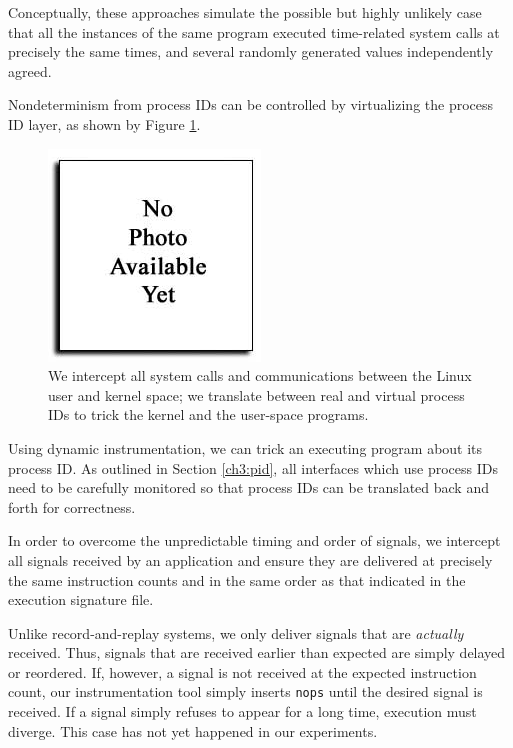 Conceptually, these approaches simulate the possible but highly
unlikely case that all the instances of the same program
executed time-related system calls
at precisely the same times,
and several randomly generated values independently agreed. \newline

 \newline
Nondeterminism from process IDs
can be controlled by virtualizing the process ID
layer, as shown by Figure \ref{ch3:pidfig}.

\begin{figure}[h]
  \center
  \includegraphics[trim=0cm 0cm 0cm 0cm, scale=0.75]{none.jpg}
  \caption[Virtualizing the process ID layer using Pin]%
  {We intercept all system calls and communications
  between the Linux user and kernel space; we
  translate between real and virtual process IDs
  to trick the kernel and the user-space programs.}
  \label{ch3:pidfig}
\end{figure} 

Using dynamic instrumentation, we can trick
an executing program about its process ID.
As outlined in Section \ref{ch3:pid}, all interfaces
which use process IDs need to be carefully monitored
so that process IDs can be translated back and forth
for correctness. \newline

 \newline
In order to overcome the unpredictable timing and 
order of signals, we intercept all signals received by 
an application and ensure they are delivered
at precisely the same instruction counts
and in the same order as that indicated
in the execution signature file.

Unlike record-and-replay systems, we only
deliver signals that are {\em actually}
received. Thus, signals that are received earlier
than expected are simply delayed or reordered. If,
however, a signal is not received at the expected
instruction count, our instrumentation tool
simply inserts \texttt{nops} until the 
desired signal is received. If a signal simply
refuses to appear for a long time, execution
must diverge. This case has not yet happened
in our experiments. \newline

